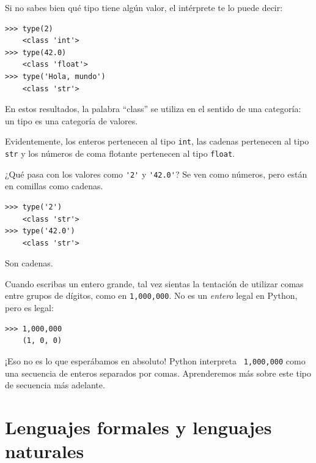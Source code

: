 \documentclass[10pt]{book}
\begin{document}
Si no sabes bien qué tipo tiene algún valor, el intérprete te lo
puede decir:

\begin{verbatim}
>>> type(2)
    <class 'int'>
>>> type(42.0)
    <class 'float'>
>>> type('Hola, mundo')
    <class 'str'>
\end{verbatim}
%
En estos resultados, la palabra ``class'' se utiliza en el sentido de
una categoría: un tipo es una categoría de valores.

Evidentemente, los enteros pertenecen al tipo {\tt int},
las cadenas pertenecen al tipo {\tt str} y los números de
coma flotante pertenecen al tipo {\tt float}.

¿Qué pasa con los valores como \verb"'2'" y \verb"'42.0'"?
Se ven como números, pero están en comillas como
cadenas.

\begin{verbatim}
>>> type('2')
    <class 'str'>
>>> type('42.0')
    <class 'str'>
\end{verbatim}
%
Son cadenas.

Cuando escribas un entero grande, tal vez sientas la tentación de utilizar comas
entre grupos de dígitos, como en {\tt 1,000,000}.  No es un
{\em entero} legal en Python, pero es legal:

\begin{verbatim}
>>> 1,000,000
    (1, 0, 0)
\end{verbatim}
%
¡Eso no es lo que esperábamos en absoluto!  Python interpreta {\tt
  1,000,000} como una secuencia de enteros separados por comas.  Aprenderemos
más sobre este tipo de secuencia más adelante.




\section{Lenguajes formales y lenguajes naturales}
\end{document}
